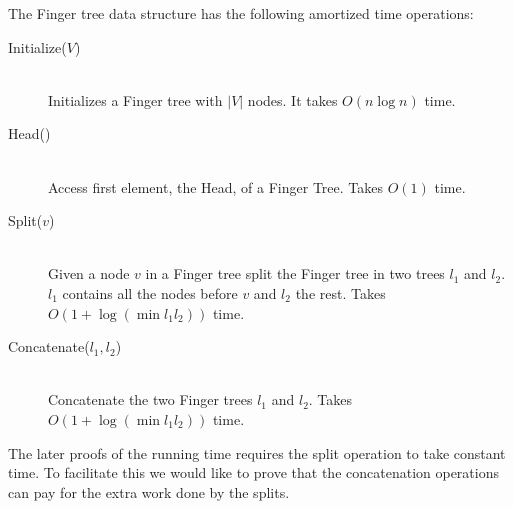 The Finger tree data structure has the following amortized time operations:
\begin{description}
	\item[Initialize($V$)] \hfill \\
	Initializes a Finger tree with $|V|$ nodes. It takes $O(n\log{n})$ time.
	\item[Head($$)] \hfill \\
	Access first element, the Head, of a Finger Tree. Takes $O(1)$ time.
	\item[Split($v$)] \hfill \\
	Given a node $v$ in a Finger tree split the Finger tree in two trees $l_1$ and $l_2$. $l_1$ contains all the nodes before $v$ and $l_2$ the rest. 
	Takes $O(1+\log{(\min{l_1}{l_2})})$ time.
	\item[Concatenate($l_1,l_2$)] \hfill \\
	Concatenate the two Finger trees $l_1$ and $l_2$. Takes $O(1+\log{(\min{l_1}{l_2})})$ time.
\end{description}

The later proofs of the running time requires the split operation to take constant time. To facilitate this we would like to prove that the
concatenation operations can pay for the extra work done by the splits. 

